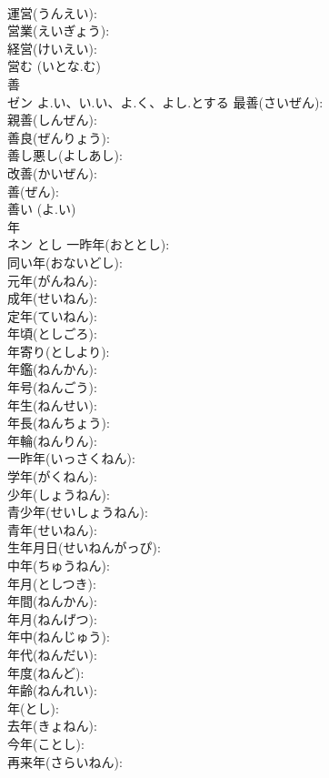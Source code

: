 \documentclass[8pt]{extreport}
\begin{document}
\begin{CJK}{UTF8}{min}
\\	運営(うんえい): 
\\	営業(えいぎょう): 
\\	経営(けいえい): 
\\	営む (いとな.む)
\\	善			
\\	ゼン	よ.い、い.い、よ.く、よし.とする	最善(さいぜん): 
\\	親善(しんぜん): 
\\	善良(ぜんりょう): 
\\	善し悪し(よしあし): 
\\	改善(かいぜん): 
\\	善(ぜん): 
\\	善い (よ.い)
\\	年			
\\	ネン	とし	一昨年(おととし): 
\\	同い年(おないどし): 
\\	元年(がんねん): 
\\	成年(せいねん): 
\\	定年(ていねん): 
\\	年頃(としごろ): 
\\	年寄り(としより): 
\\	年鑑(ねんかん): 
\\	年号(ねんごう): 
\\	年生(ねんせい): 
\\	年長(ねんちょう): 
\\	年輪(ねんりん): 
\\	一昨年(いっさくねん): 
\\	学年(がくねん): 
\\	少年(しょうねん): 
\\	青少年(せいしょうねん): 
\\	青年(せいねん): 
\\	生年月日(せいねんがっぴ): 
\\	中年(ちゅうねん): 
\\	年月(としつき): 
\\	年間(ねんかん): 
\\	年月(ねんげつ): 
\\	年中(ねんじゅう): 
\\	年代(ねんだい): 
\\	年度(ねんど): 
\\	年齢(ねんれい): 
\\	年(とし): 
\\	去年(きょねん): 
\\	今年(ことし): 
\\	再来年(さらいねん): 

\end{CJK}
\end{document}
